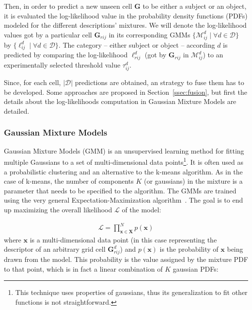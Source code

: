 \documentclass[10pt,twocolumn,letterpaper]{article}
\begin{document}
Then, in order to predict a new unseen cell $\mathbf{G}$ to be either a subject or an object, it is evaluated the log-likelihood value in the probability density functions (PDFs) modeled for the different descriptions' mixtures. We will denote the log-likelihood values got by a particular cell $\mathbf{G}_{rij}$ in its corresponding GMMs $\{\mathcal{M}_{ij}^{d} \;|\; \forall d \in \mathcal{D}\}$ by $\{\ell_{ij}^{d} \;|\; \forall d \in \mathcal{D}\}$. The category -- either subject or object -- according $d$ is predicted by comparing the log-likelihood $\ell_{rij}^{d}$ (got by $\mathbf{G}_{rij}$ in $\mathcal{M}_{ij}^{d}$) to an experimentally selected threshold value $\tau_{ij}^d$. 

Since, for each cell, $|\mathcal{D}|$ predictions are obtained, an strategy to fuse them has to be developed. Some approaches are proposed in Section~\ref{ssec:fusion}, but first the details about the log-likelihoods computation in Gaussian Mixture Models are detailed.

\subsubsection{Gaussian Mixture Models} \label{section:gmm}

Gaussian Mixture Models (GMM) is an unsupervised learning method for fitting multiple Gaussians to a set of multi-dimensional data points\footnote{This technique uses properties of gaussians, thus its generalization to fit other functions is not straightforward.}. It is often used as a probabilistic clustering and an alternative to the k-means algorithm. As in the case of k-means, the number of components $K$ (or gaussians) in the mixture is a parameter that needs to be specified to the algorithm. The GMMs are trained using the very general Expectation-Maximization algorithm~\cite{moon1996expectation}. The goal is to end up maximizing the overall likelihood $\mathcal{L}$ of the model:

\begin{gather}
	\mathcal{L} = \prod_{\mathbf{x} \in \mathbf{X}}^{N} p(\mathbf{x})
\end{gather}
where $\mathbf{x}$ is a multi-dimensional data point (in this case representing the descriptor of an arbitrary grid cell $\mathbf{G}_{rij}^{d}$) and $p(\mathbf{x})$ is the probability of $\mathbf{x}$ being drawn from the model. This probability is the value assigned by the mixture PDF to that point, which is in fact a linear combination of $K$ gaussian PDFs:
\end{document}
